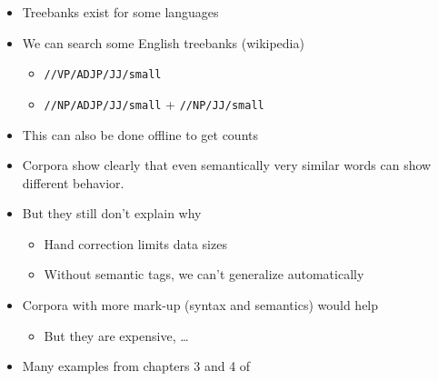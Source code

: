 \documentclass[a4paper,landscape,headrule,footrule,dvips]{foils}
\begin{document}
\begin{CJK}{UTF8}{min}
\begin{itemize}
\item Treebanks exist for some languages
\item We can search some English treebanks (wikipedia)
\\ 
\begin{itemize}
\item  \verb|//VP/ADJP/JJ/small| 
\item \verb|//NP/ADJP/JJ/small| + \verb|//NP/JJ/small| 
\end{itemize}
\item This can also be done offline to get counts
\end{itemize}




\MyLogo{}
\begin{itemize}
\item Corpora show clearly that even semantically very similar words
  can show different behavior.
\item But they still don't explain why
  \begin{itemize}
  \item Hand correction limits data sizes
  \item Without semantic tags, we can't generalize automatically
  \end{itemize}
\item Corpora with more mark-up (syntax and semantics) would help
  \begin{itemize}
  \item But they are expensive, \ldots
  \end{itemize}
\end{itemize}


\begin{itemize}
\item Many examples from chapters 3 and 4 of 
\end{itemize}


\end{CJK}
\end{document}

